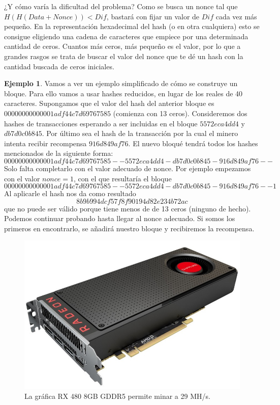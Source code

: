 \documentclass[twoside]{article}
\theoremstyle{definition}
\newtheorem{ej}[teorema]{Ejemplo}
\begin{document}
¿Y cómo varía la dificultad del problema? Como se busca un nonce tal que $H(H(Data+Nonce)) < Dif$, bastará con fijar un valor de $Dif$ cada vez más pequeño. En la representación hexadecimal del hash (o en otra cualquiera) esto se consigue eligiendo una cadena de caracteres que empiece por una determinada cantidad de ceros. Cuantos más ceros, más pequeño es el valor, por lo que a grandes rasgos se trata de buscar el valor del nonce que te dé un hash con la cantidad buscada de ceros iniciales. 

\begin{ej} Vamos a ver un ejemplo simplificado de cómo se construye un bloque. Para ello vamos a usar hashes reducidos, en lugar de los reales de 40 caracteres. Supongamos que el valor del hash del anterior bloque es $00000000000001adf44c7d69767585$ (comienza con 13 ceros). Consideremos dos hashes de transacciones esperando a ser incluidas en el bloque $5572eca4dd4$ y  $db7d0c0b845$. Por último sea el hash de la transacción por la cual el minero intenta recibir recompensa $916d849af76$. El nuevo bloqué tendrá todos los hashes mencionados de la siguiente forma: 
$$00000000000001adf44c7d69767585--5572eca4dd4-db7d0c0b845-916d849af76--$$
Solo falta completarlo con el valor adecuado de nonce. Por ejemplo empezamos con el valor $nonce=1$, con el que resultaría el bloque
$$00000000000001adf44c7d69767585--5572eca4dd4-db7d0c0b845-916d849af76--1$$
Al aplicarle el hash nos da como resultado 
$$8b9b994dcf57f8f90194d82e234b72ac$$
que no puede ser válido porque tiene menos de de 13 ceros (ninguno de hecho). Podemos continuar probando hasta llegar al nonce adecuado. Si somos los primeros en encontrarlo, se añadirá nuestro bloque y recibiremos la recompensa.

\end{ej}


\begin{figure}[h!]
\includegraphics[scale=0.15]{grafica}
\captionsetup{labelformat=empty}
 \caption{La gráfica RX 480 8GB GDDR5 permite minar a  29 MH/s.}
\end{figure}
\end{document}
